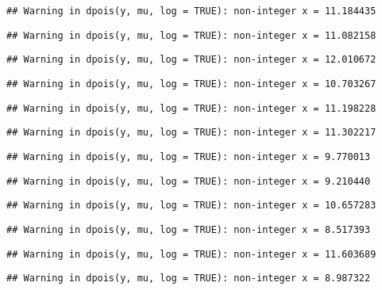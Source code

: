 \documentclass[
]{article}
\begin{document}
\begin{verbatim}
## Warning in dpois(y, mu, log = TRUE): non-integer x = 11.184435
\end{verbatim}

\begin{verbatim}
## Warning in dpois(y, mu, log = TRUE): non-integer x = 11.082158
\end{verbatim}

\begin{verbatim}
## Warning in dpois(y, mu, log = TRUE): non-integer x = 12.010672
\end{verbatim}

\begin{verbatim}
## Warning in dpois(y, mu, log = TRUE): non-integer x = 10.703267
\end{verbatim}

\begin{verbatim}
## Warning in dpois(y, mu, log = TRUE): non-integer x = 11.198228
\end{verbatim}

\begin{verbatim}
## Warning in dpois(y, mu, log = TRUE): non-integer x = 11.302217
\end{verbatim}

\begin{verbatim}
## Warning in dpois(y, mu, log = TRUE): non-integer x = 9.770013
\end{verbatim}

\begin{verbatim}
## Warning in dpois(y, mu, log = TRUE): non-integer x = 9.210440
\end{verbatim}

\begin{verbatim}
## Warning in dpois(y, mu, log = TRUE): non-integer x = 10.657283
\end{verbatim}

\begin{verbatim}
## Warning in dpois(y, mu, log = TRUE): non-integer x = 8.517393
\end{verbatim}

\begin{verbatim}
## Warning in dpois(y, mu, log = TRUE): non-integer x = 11.603689
\end{verbatim}

\begin{verbatim}
## Warning in dpois(y, mu, log = TRUE): non-integer x = 8.987322
\end{verbatim}
\end{document}
